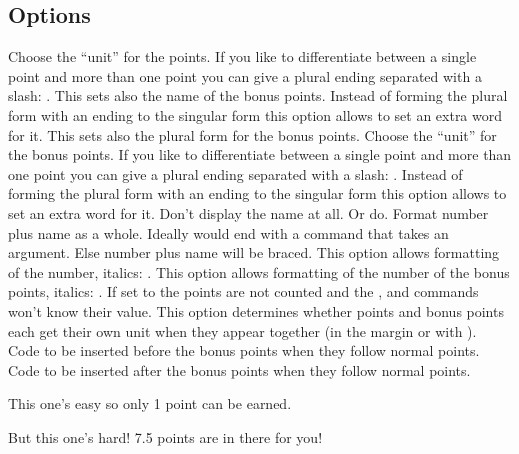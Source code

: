 \documentclass[DIV10,toc=index,toc=bib,numbers=noendperiod]{cnpkgdoc}
\begin{document}
\subsection{Options}
\begin{beschreibung}
    Choose the ``unit'' for the points.  If you like to differentiate between
    a single point and more than one point you can give a plural ending
    separated with a slash: .  This sets also the name of
    the bonus points.
  \Default{}
    Instead of forming the plural form with an ending to the singular form
    this option allows to set an extra word for it.  This sets also the plural
    form for the bonus points.
    Choose the ``unit'' for the bonus points.  If you like to differentiate
    between a single point and more than one point you can give a plural
    ending separated with a slash: .
  \Default{}
    Instead of forming the plural form with an ending to the singular form
    this option allows to set an extra word for it.
    Don't display the name at all.  Or do.
    Format number plus name as a whole.  Ideally
     would end with a command that takes an argument.  Else
    number plus name will be braced.
  \Default{}
    This option allows formatting of the number, \eg italics:
    .
  \Default{}
    This option allows formatting of the number of the bonus points, \eg
    italics: .
    If set to  the points are not counted and the
    ,  and  commands won't know
    their value.
    This option determines whether points and bonus points each get their own
    unit when they appear together (in the margin or with ).
  \Default{(+}
    Code to be inserted before the bonus points when they follow normal
    points.
  \Default{)}
    Code to be inserted after the bonus points when they follow normal
    points.
\end{beschreibung}
\begin{beispiel}
 \begin{question}{1}
  This one's easy so only 1 point can be earned.
 \end{question}
 \begin{question}{7.5}
  But this one's hard! 7.5 points are in there for you!
 \end{question}
\end{beispiel}
\end{document}
